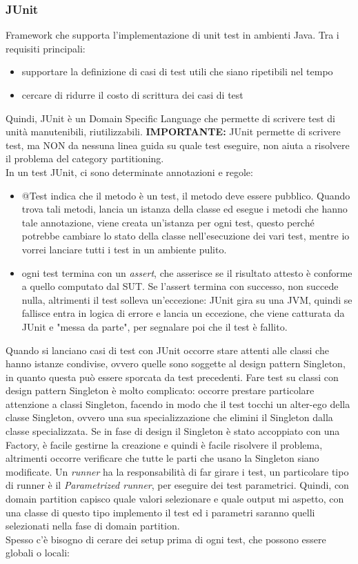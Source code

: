 \documentclass{article}
\begin{document}
\subsubsection{JUnit}
Framework che supporta l'implementazione di unit test in ambienti Java. Tra i requisiti principali:
\begin{itemize}
\item supportare la definizione di casi di test utili che siano ripetibili nel tempo
\item cercare di ridurre il costo di scrittura dei casi di test
\end{itemize}
Quindi, JUnit è un Domain Specific Language che permette di scrivere test di unità manutenibili, riutilizzabili. \textbf{IMPORTANTE:} JUnit permette di scrivere test, ma NON da nessuna linea guida su quale test eseguire, non aiuta a risolvere il problema del category partitioning.\\ In un test JUnit, ci sono determinate annotazioni e regole:
\begin{itemize}
\item @Test indica che il metodo è un test, il metodo deve essere pubblico. Quando trova tali metodi, lancia un istanza della classe ed esegue i metodi che hanno tale annotazione, viene creata un'istanza per ogni test, questo perché potrebbe cambiare lo stato della classe nell'esecuzione dei vari test, mentre io vorrei lanciare tutti i test in un ambiente pulito.
\item ogni test termina con un \textit{assert}, che asserisce se il risultato attesto è conforme a quello computato dal SUT. Se l'assert termina con successo, non succede nulla, altrimenti il test solleva un'eccezione: JUnit gira su una JVM, quindi se fallisce entra in logica di errore e lancia un eccezione, che viene catturata da JUnit e "messa da parte", per segnalare poi che il test è fallito.
\end{itemize}
Quando si lanciano casi di test con JUnit occorre stare attenti alle classi che hanno istanze condivise, ovvero quelle sono soggette al design pattern Singleton, in quanto questa può essere sporcata da test precedenti. Fare test su classi con design pattern Singleton è molto complicato: occorre prestare particolare attenzione a classi Singleton, facendo in modo che il test tocchi un alter-ego della classe Singleton, ovvero una sua specializzazione che elimini il Singleton dalla classe specializzata. Se in fase di design il Singleton è stato accoppiato con una Factory, è facile gestirne la creazione e quindi è facile risolvere il problema, altrimenti occorre verificare che tutte le parti che usano la Singleton siano modificate. Un \textit{runner} ha la responsabilità di far girare i test, un particolare tipo di runner è il \textit{Parametrized runner}, per eseguire dei test parametrici. Quindi, con domain partition capisco quale valori selezionare e quale output mi aspetto, con una classe di questo tipo implemento il test ed i parametri saranno quelli selezionati nella fase di domain partition.\\ Spesso c'è bisogno di cerare dei setup prima di ogni test, che possono essere globali o locali:
\end{document}
